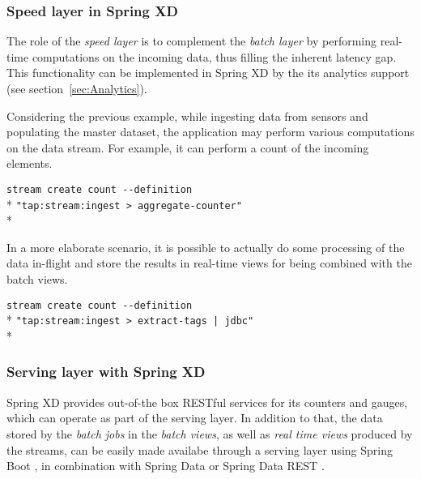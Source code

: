 \subsubsection {Speed layer in Spring XD}

The role of the \emph{speed layer} is to complement the \emph{batch layer} 
by performing real-time computations on the incoming data, thus filling the 
inherent latency gap. This functionality can be implemented in Spring XD by 
the its analytics support (see section~\ref{sec:Analytics}).

Considering the previous example, while ingesting data from sensors and 
populating the master dataset, the application may perform various computations 
on the data stream. For example, it can perform a count of the incoming elements. 

\verb;stream create count --definition  ;\\*
\verb;"tap:stream:ingest > aggregate-counter";\\*

In a more elaborate scenario, it is possible to actually do 
some processing of the data in-flight and store the results in real-time views
for being combined with the batch views.

\verb;stream create count --definition  ;\\*
\verb;"tap:stream:ingest > extract-tags | jdbc";\\*

\subsubsection {Serving layer with Spring XD}

Spring XD provides out-of-the box RESTful services for its counters and gauges,
which can operate as part of the serving layer. In addition to that,  
the data stored by the \emph{batch jobs} in the 
\emph{batch views}, as well as \emph{real time views} produced by the streams, 
can be easily made availabe through a serving layer using Spring Boot \cite{spring-boot}, 
in combination with Spring Data \cite{spring-data} or Spring Data REST \cite{spring-data-rest}.


